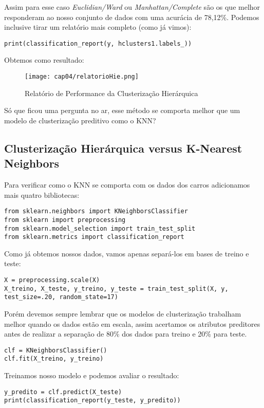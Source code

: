 Assim para esse caso \textit{Euclidian/Ward} ou \textit{Manhattan/Complete} são os que melhor responderam ao nosso conjunto de dados com uma acurácia de 78,12\%. Podemos inclusive tirar um relatório mais completo (como já vimos):
\begin{lstlisting}[]
print(classification_report(y, hclusters1.labels_))
\end{lstlisting}

Obtemos como resultado:
\begin{figure}[H]
	\centering
	\texttt{[image: cap04/relatorioHie.png]}
	\caption{Relatório de Performance da Clusterização Hierárquica}
\end{figure}


Só que ficou uma pergunta no ar, esse método se comporta melhor que um modelo de clusterização preditivo como o KNN?

\subsection{Clusterização Hierárquica versus K-Nearest Neighbors}
Para verificar como o KNN se comporta com os dados dos carros adicionamos mais quatro bibliotecas:
\begin{lstlisting}[]
from sklearn.neighbors import KNeighborsClassifier
from sklearn import preprocessing
from sklearn.model_selection import train_test_split
from sklearn.metrics import classification_report
\end{lstlisting}

Como já obtemos nossos dados, vamos apenas separá-los em bases de treino e teste:
\begin{lstlisting}[]
X = preprocessing.scale(X)
X_treino, X_teste, y_treino, y_teste = train_test_split(X, y, test_size=.20, random_state=17)
\end{lstlisting}

Porém devemos sempre lembrar que os modelos de clusterização trabalham melhor quando os dados estão em escala, assim acertamos os atributos preditores antes de realizar a separação de 80\% dos dados para treino e 20\% para teste.
\begin{lstlisting}[]
clf = KNeighborsClassifier()
clf.fit(X_treino, y_treino)
\end{lstlisting}

Treinamos nosso modelo e podemos avaliar o resultado:
\begin{lstlisting}[]
y_predito = clf.predict(X_teste)
print(classification_report(y_teste, y_predito))
\end{lstlisting}
	
